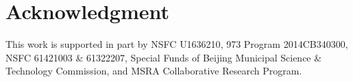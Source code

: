 \documentclass[10pt,conference,letterpaper]{IEEEtran}
\newcommand{\eat}[1]{}
\newcommand{\stitle}[1]{\vspace{0.5ex}\noindent{\bf #1}}
\begin{document}



\eat{%
\stitle{Acknowledgments}.
This work is supported in part by  973 program ({\small No. 2014CB340300}), NSFC ({\small No. 61322207\&61421003}),  Special Funds of Beijing Municipal Science \& Technology Commission, and MSRA Collaborative Research Program. We also thank Liang Duan, Niannian Wu and Dr. Xuelian Lin for their support.
}%

\section*{Acknowledgment}
This work is supported in part by NSFC {\small U1636210}, 973 Program {\small 2014CB340300}, NSFC {\small 61421003 \& 61322207}, Special Funds of Beijing Municipal Science \& Technology Commission, and MSRA Collaborative Research Program.


%


\balance


\begin{small}

\end{small}

%
%


\end{document}
